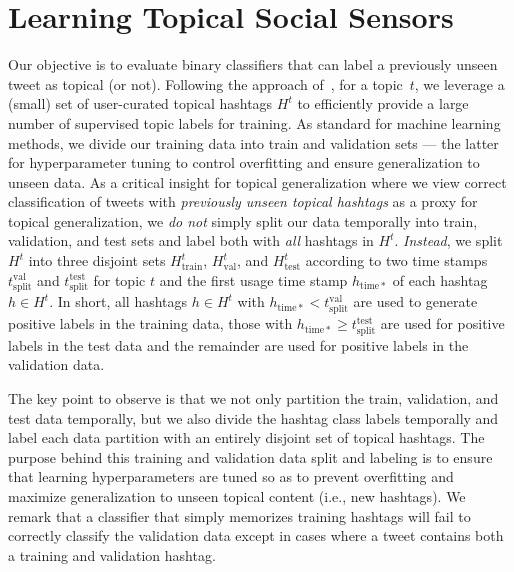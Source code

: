 \documentclass[letterpaper]{article}
\begin{document}
\section{Learning Topical Social Sensors}
\label{sec:lss}
Our objective is to evaluate binary classifiers that can label
a previously unseen tweet as topical (or not).
Following
the approach of~\cite{lin2011smoothing}, for a topic~$t$, we leverage a (small) set of
user-curated topical hashtags $H^t$ to efficiently provide a large number of
supervised topic labels for training.  
As standard for machine learning methods, we divide our training data into
train and validation sets --- the latter for hyperparameter tuning to control
overfitting and ensure generalization to unseen data.  
As a critical insight for topical generalization where we view correct classification 
of tweets with \emph{previously unseen topical hashtags} as a proxy for topical generalization, 
we \emph{do not} simply
split our data temporally into train, validation, and test sets and label both with \emph{all} 
hashtags in $H^t$.  \emph{Instead},
we split $H^t$ into three disjoint sets $H^t_\mathrm{train}$, $H^t_\mathrm{val}$, and 
$H^t_\mathrm{test}$ 
according to two time stamps $t^\mathrm{val}_\mathrm{split}$ and $t^\mathrm{test}_\mathrm{split}$ for topic $t$ and the first usage time stamp 
$h_\mathrm{time*}$ of each hashtag $h \in H^t$.  In short, all hashtags $h \in H^t$ with
$h_\mathrm{time*} < t^\mathrm{val}_\mathrm{split}$ are used to generate positive labels in the training data, those with $h_\mathrm{time*} \geq t^\mathrm{test}_\mathrm{split}$ are used for positive labels in the test data and the remainder are used for positive labels in the validation data.

The key point to observe is that we not only partition the train, validation, and test data 
temporally, but we also divide the hashtag class labels temporally and label each data partition with
an entirely disjoint set of topical hashtags.
The purpose behind this training and validation data split
and labeling is to ensure that learning hyperparameters are tuned so as
to prevent overfitting and maximize generalization to unseen topical
content (i.e., new hashtags).
We remark that a classifier that simply
memorizes training hashtags will fail to correctly classify the validation data except in 
cases where a tweet contains both a training and validation hashtag.
\end{document}
